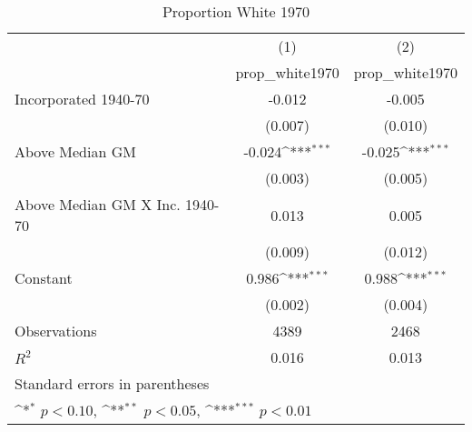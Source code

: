 \begin{table}[htbp]\centering
\def\sym#1{\ifmmode^{#1}\else\(^{#1}\)\fi}
\caption{Proportion White 1970}
\begin{tabular}{l*{2}{c}}
\hline\hline
                    &\multicolumn{1}{c}{(1)}&\multicolumn{1}{c}{(2)}\\
                    &\multicolumn{1}{c}{prop\_white1970}&\multicolumn{1}{c}{prop\_white1970}\\
\hline
Incorporated 1940-70&      -0.012         &      -0.005         \\
                    &     (0.007)         &     (0.010)         \\
[1em]
Above Median GM     &      -0.024\sym{***}&      -0.025\sym{***}\\
                    &     (0.003)         &     (0.005)         \\
[1em]
Above Median GM X Inc. 1940-70&       0.013         &       0.005         \\
                    &     (0.009)         &     (0.012)         \\
[1em]
Constant            &       0.986\sym{***}&       0.988\sym{***}\\
                    &     (0.002)         &     (0.004)         \\
\hline
Observations        &        4389         &        2468         \\
\(R^{2}\)           &       0.016         &       0.013         \\
\hline\hline
\multicolumn{3}{l}{\footnotesize Standard errors in parentheses}\\
\multicolumn{3}{l}{\footnotesize \sym{*} \(p<0.10\), \sym{**} \(p<0.05\), \sym{***} \(p<0.01\)}\\
\end{tabular}
\end{table}
